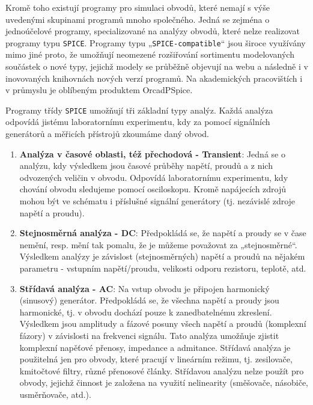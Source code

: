       Kromě toho existují programy pro simulaci obvodů, které nemají s výše uvedenými skupinami
      programů mnoho společného. Jedná se zejména o jednoúčelové programy, specializované na analýzy
      obvodů, které nelze realizovat programy typu \texttt{SPICE}. Programy typu
      „\texttt{SPICE-compatible}“ jsou široce využívány mimo jiné proto, že umožňují neomezené
      rozšiřování sortimentu modelovaných součástek o nové typy, jejichž modely se průběžně objevují
      na webu a následně i v inovovaných knihovnách nových verzí programů. Na akademických
      pracovištích i v průmyslu je oblíbeným produktem OrcadPSpice. \cite[s.~10]{Biolek2005}

      Programy třídy \texttt{SPICE} umožňují tři základní typy analýz. Každá analýza odpovídá
      jistému laboratornímu experimentu, kdy za pomocí signálních generátorů a měřicích přístrojů
      zkoumáme daný obvod. 
      \begin{enumerate}[leftmargin=1cm,rightmargin=.1cm, label=\emph{\alph*}),noitemsep]
        \item \textbf{Analýza v časové oblasti, též přechodová - Transient}: Jedná se o analýzu, kdy
              výsledkem jsou časové průběhy napětí, proudů a z nich odvozených veličin v obvodu.
              Odpovídá laboratornímu experimentu, kdy chování obvodu sledujeme pomocí osciloskopu.
              Kromě napájecích zdrojů mohou být ve schématu i příslušné signální generátory (tj.
              nezávislé zdroje napětí a proudu). 
        \item \textbf{Stejnosměrná analýza - DC}: Předpokládá se, že napětí a proudy se v čase
              nemění, resp. mění tak pomalu, že je můžeme považovat za „stejnosměrné“. Výsledkem
              analýzy je závislost (stejnosměrných) napětí a proudů na nějakém parametru - vstupním
              napětí/proudu, velikosti odporu rezistoru, teplotě, atd. 
        \item \textbf{Střídavá analýza - AC}: Na vstup obvodu je připojen harmonický (sinusový)
              generátor. Předpokládá se, že všechna napětí a proudy jsou harmonické, tj. v obvodu
              dochází pouze k zanedbatelnému zkreslení. Výsledkem jsou amplitudy a fázové posuny
              všech napětí a proudů (komplexní fázory) v závislosti na frekvenci signálu. Tato
              analýza umožňuje zjistit komplexní napěťové přenosy, impedance a admitance. Střídavá
              analýza je použitelná jen pro obvody, které pracují v lineárním režimu, tj.
              zesilovače, kmitočtové filtry, různé přenosové články. Střídavou analýzu nelze použít
              pro obvody, jejichž činnost je založena na využití nelinearity (směšovače, násobiče,
              usměrňovače, atd.).
      \end{enumerate}

